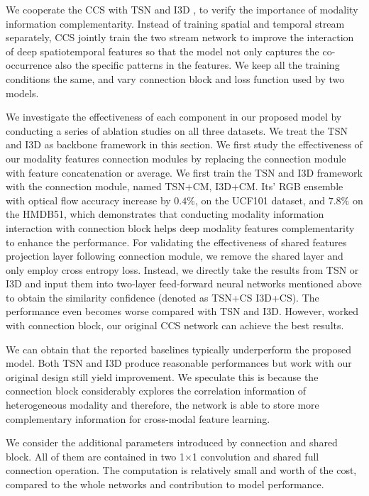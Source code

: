 \documentclass[conference,compsoc]{IEEEtran}
\begin{document}
We cooperate the CCS with TSN \cite{wang2016temporal} and I3D \cite{carreira2017quo}, to verify the importance of modality information complementarity. Instead of training spatial and temporal stream separately, CCS jointly train the two stream network to improve the interaction of deep spatiotemporal features so that the model not only captures the co-occurrence also the specific patterns in the features. We keep all the training conditions the same, and vary connection block and loss function used by two models.

We investigate the effectiveness of each component in our proposed model by conducting a series of ablation studies on all three datasets. We treat the TSN \cite{wang2016temporal} and I3D \cite{carreira2017quo} as backbone framework in this section. We first study the effectiveness of our modality features connection modules by replacing the connection module with feature concatenation or average. We first train the TSN and I3D framework with the connection module, named TSN+CM, I3D+CM. Its' RGB ensemble with optical flow accuracy increase by $0.4\%$, on the UCF101 dataset, and $7.8\%$ on the HMDB51, which demonstrates that conducting modality information interaction with connection block helps deep modality features complementarity to enhance the performance. For validating the effectiveness of shared features projection layer following connection module, we remove the shared layer and only employ cross entropy loss. Instead, we directly take the results from TSN or I3D and input them into two-layer feed-forward neural networks mentioned above to obtain the similarity confidence (denoted as TSN+CS I3D+CS). The performance even becomes worse compared with TSN and I3D. However, worked with connection block, our original CCS network can achieve the best results.

We can obtain that the reported baselines typically underperform the proposed model. Both TSN \cite{wang2016temporal} and I3D \cite{carreira2017quo} produce reasonable performances but work with our original design still yield improvement. We speculate this is because the connection block considerably explores the correlation information of heterogeneous modality and therefore, the network is able to store more complementary information for cross-modal feature learning.

We consider the additional parameters introduced by connection and shared block. All of them are contained in two 1$\times$1 convolution and shared full connection operation. The computation is relatively small and worth of the cost, compared to the whole networks and contribution to model performance.
\end{document}
